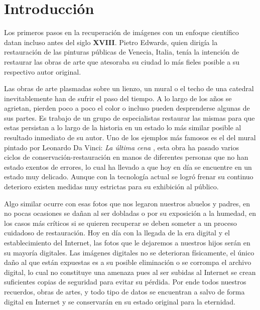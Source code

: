 \chapter*{Introducción}\label{chapter:introduction}

\qquad

Los primeros pasos en la recuperaci\'on de imágenes con un enfoque científico datan incluso antes del siglo \textbf{XVIII}. Pietro Edwards\cite{itwiki:PE}, quien dirigía la restauraci\'on de las pinturas p\'ublicas de Venecia, Italia, ten\'ia la intenci\'on de restaurar las obras de arte que atesoraba su ciudad lo m\'as fieles posible a su respectivo autor original.

Las obras de arte plasmadas sobre un lienzo, un mural o el techo de una catedral inevitablemente han de sufrir el paso del tiempo. A lo largo de los años se agrietan, pierden poco a poco el color o incluso pueden desprenderse algunas de sus partes. Es trabajo de un grupo de especialistas restaurar las mismas para que estas persistan a lo largo de la historia en un estado lo m\'as similar posible al resultado inmediato de su autor. Uno de los ejemplos m\'as famosos es el del mural pintado por Leonardo Da Vinci: \textit{La \'ultima cena} \cite{wiki:CR-TLS}, esta obra ha pasado varios ciclos de conservaci\'on-restauraci\'on en manos de diferentes personas que no han estado exentos de errores, lo cual ha llevado a que hoy en d\'ia se encuentre en un estado muy delicado. Aunque con la tecnología actual se logr\'o frenar su continuo deterioro existen medidas muy estrictas para su exhibición al p\'ublico.

Algo similar ocurre con esas fotos que nos legaron nuestros abuelos y padres, en no pocas ocasiones se dañan al ser dobladas o por su exposici\'on a la humedad, en los casos m\'as cr\'iticos si se quieren recuperar se deben someter a un proceso cuidadoso de restauraci\'on. Hoy en d\'ia con la llegada de la era digital y el establecimiento del Internet, las fotos que le dejaremos a nuestros hijos ser\'an en su mayor\'ia digitales. Las im\'agenes digitales no se deterioran físicamente, el \'unico daño al que est\'an expuestas es a su posible eliminaci\'on o se corrompa el archivo digital, lo cual no constituye una amenaza pues al ser subidas al Internet se crean suficientes copias de seguridad para evitar su p\'erdida. Por ende todos nuestros recuerdos, obras de artes, y todo tipo de datos se encuentran a salvo de forma digital en Internet y se conservar\'an en su estado original para la eternidad.

